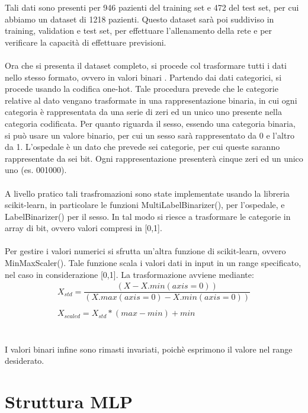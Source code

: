 Tali dati sono presenti per 946 pazienti del training set e 472 del test set, per cui abbiamo un dataset di 1218 pazienti.
Questo dataset sarà poi suddiviso in training, validation e test set, per effettuare l'allenamento della rete e per verificare la capacità di effettuare previsioni.
\\\\
Ora che si presenta il dataset completo, si procede col trasformare tutti i dati nello stesso formato, ovvero in valori binari \cite{ar}.
Partendo dai dati categorici, si procede usando la codifica one-hot. Tale procedura prevede che le categorie relative al dato vengano 
trasformate in una rappresentazione binaria, in cui ogni categoria è rappresentata da una serie di zeri ed un unico uno presente nella categoria
codificata.
Per quanto riguarda il sesso, essendo una categoria binaria, si può usare un valore binario, per cui un sesso sarà rappresentato da 0 e l'altro da 1.
L'ospedale è un dato che prevede sei categorie, per cui queste saranno rappresentate da sei bit. Ogni rappresentazione
presenterà cinque zeri ed un unico uno (es. 001000).
\\\\
A livello pratico tali trasfromazioni sono state implementate usando la libreria scikit-learn, in particolare le funzioni
MultiLabelBinarizer(), per l'ospedale, e LabelBinarizer() per il sesso. In tal modo si riesce a trasformare le categorie in array di 
bit, ovvero valori compresi in [0,1].
\\\\
Per gestire i valori numerici si sfrutta un'altra funzione di scikit-learn, ovvero MinMaxScaler().
Tale funzione scala i valori dati in input in un range specificato, nel caso in considerazione [0,1].
La trasformazione avviene mediante:
\begin{equation*}
    \begin{array}{l}
        X_{std} = \dfrac{(X - X.min(axis=0))}  {(X.max(axis=0) - X.min(axis=0))} \\\\
        X_{scaled} = X_{std} * (max - min) + min
    \end{array}
\end{equation*}
\\\\
I valori binari infine sono rimasti invariati, poichè esprimono il valore nel range desiderato.

\section{Struttura MLP}

